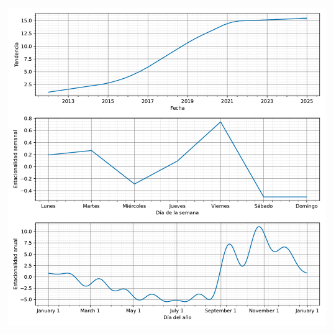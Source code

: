 \begin{figure}[H]
	{\includegraphics[width=0.75\textwidth]{imagenes/comps_limpiaparabrisas.pdf}}
\end{figure}